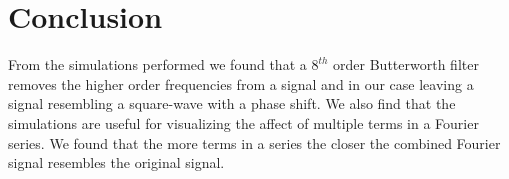 \documentclass[main.tex]{subfile}
\begin{document}
\section{Conclusion} 
\label{sec:conclusion}

From the simulations performed we found that a $8^{th}$ order Butterworth filter
removes the higher order frequencies from a signal and in our case leaving a
signal resembling a square-wave with a phase shift. We also find that the
\Labview simulations are useful for visualizing the affect of multiple terms in
a Fourier series. We found that the more terms in a series the closer the
combined Fourier signal resembles the original signal.

\end{document}
